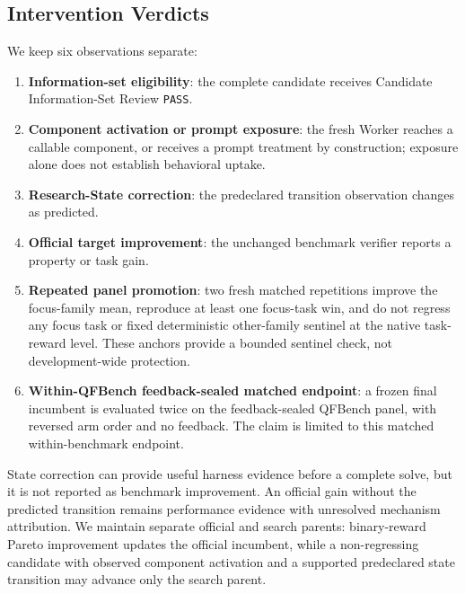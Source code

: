 \subsection{Intervention Verdicts}

We keep six observations separate:

\begin{enumerate}
    \item \textbf{Information-set eligibility}: the complete candidate receives
    Candidate Information-Set Review \texttt{PASS}.
    \item \textbf{Component activation or prompt exposure}: the fresh Worker
    reaches a callable component, or receives a prompt treatment by
    construction; exposure alone does not establish behavioral uptake.
    \item \textbf{Research-State correction}: the predeclared transition
    observation changes as predicted.
    \item \textbf{Official target improvement}: the unchanged benchmark verifier
    reports a property or task gain.
    \item \textbf{Repeated panel promotion}: two fresh matched repetitions
    improve the focus-family mean, reproduce at least one focus-task win, and
    do not regress any focus task or fixed deterministic other-family sentinel
    at the native task-reward level. These anchors provide a bounded sentinel
    check, not development-wide protection.
    \item \textbf{Within-QFBench feedback-sealed matched endpoint}: a frozen
    final incumbent is evaluated twice on the feedback-sealed QFBench panel,
    with reversed arm order and no feedback. The claim is limited to this
    matched within-benchmark endpoint.
\end{enumerate}

State correction can provide useful harness evidence before a complete solve,
but it is not reported as benchmark improvement. An official gain without the
predicted transition remains performance evidence with unresolved mechanism
attribution. We maintain separate official and search parents: binary-reward
Pareto improvement updates the official incumbent, while a non-regressing
candidate with observed component activation and a supported predeclared state
transition may advance only the search parent.  

